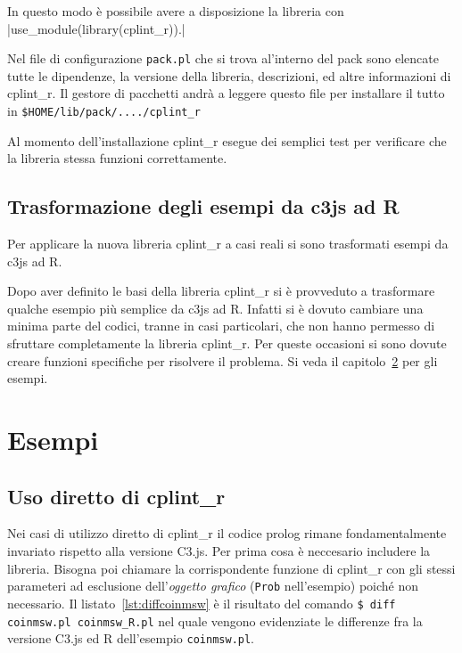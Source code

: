 \documentclass[10pt,titlepage,twoside,a4paper]{report}
\begin{document}
In questo modo è possibile avere a disposizione la libreria con 
|use_module(library(cplint_r)).|

Nel file di configurazione \texttt{pack.pl} che si trova al'interno del pack 
sono elencate tutte le dipendenze, la versione della libreria, descrizioni, 
ed altre informazioni di cplint\_r. Il gestore di pacchetti andrà a leggere 
questo file per installare il tutto in \texttt{\$HOME/lib/pack/..../cplint\_r}

Al momento dell'installazione cplint\_r esegue dei semplici 
test per verificare che la libreria stessa funzioni correttamente.


\section{Trasformazione degli esempi da c3js ad R} \label{sec:trasformazione-
degli-esempi-da-c3js-ad-r}
Per applicare la nuova libreria cplint\_r a casi reali si sono trasformati 
esempi da c3js ad R.

Dopo aver definito le basi della libreria cplint\_r si è provveduto a 
trasformare qualche esempio più semplice da c3js ad R. Infatti si è 
dovuto cambiare una minima parte del codici, tranne in casi particolari, che 
non hanno permesso di sfruttare completamente la 
libreria cplint\_r. Per queste occasioni si sono dovute creare funzioni 
specifiche per risolvere il problema. Si veda il capitolo~\ref{ch:esempi} per 
gli esempi.




\chapter{Esempi}
\label{ch:esempi}

\section{Uso diretto di cplint\_r}
Nei casi di utilizzo diretto di cplint\_r il codice prolog rimane 
fondamentalmente invariato rispetto alla  versione C3.js. Per prima cosa è 
neccesario includere la libreria. Bisogna poi chiamare la corrispondente 
funzione di cplint\_r con gli stessi parameteri ad esclusione 
dell'\emph{oggetto grafico} (\texttt{Prob} nell'esempio) poiché non 
necessario. Il listato~\ref{lst:diffcoinmsw} è il risultato del comando
\texttt{\$ diff coinmsw.pl coinmsw\_R.pl}
nel quale vengono evidenziate le differenze fra la versione C3.js 
\cite{coinmswpl} ed R \cite{coinmswrpl} dell'esempio \texttt{coinmsw.pl}.
\end{document}

